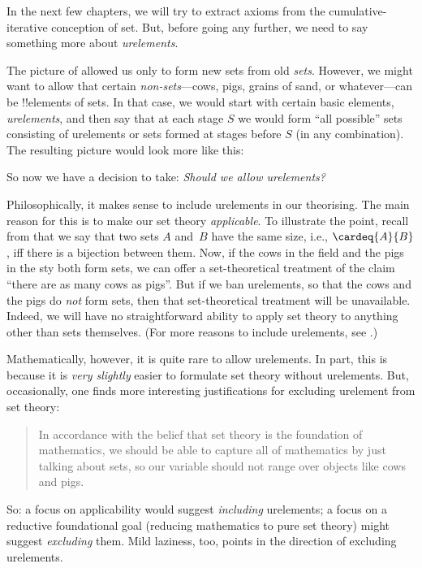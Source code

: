 \documentclass[../../../include/open-logic-section]{subfiles}
\begin{document}

In the next few chapters, we will try to extract axioms from the
cumulative-iterative conception of set. But, before going any further,
we need to say something more about \emph{urelements}. 

The picture of  allowed us only to form new sets
from old \emph{sets}. However, we might want to allow that certain
\emph{non-sets}---cows, pigs, grains of sand, or whatever---can be
!!{element}s of sets. In that case, we would start with certain basic
elements, \emph{urelements}, and then say that at each stage $S$ we
would form ``all possible'' sets consisting of urelements or sets
formed at stages before $S$ (in any combination). The resulting
picture would look more like this:
\begin{center}
\end{center}
So now we have a decision to take: \emph{Should we allow urelements?}

Philosophically, it makes sense to include urelements in our
theorising. The main reason for this is to make our set theory
\emph{applicable}. To illustrate the point, recall from
 that we say that two sets $A$ and~$B$ have
the same size, i.e., $\cardeq{A}{B}$, iff there is a bijection between
them. Now, if the cows in the field and the pigs in the sty both form
sets, we can offer a set-theoretical treatment of the claim ``there
are as many cows as pigs''. But if we ban urelements, so that the cows
and the pigs do \emph{not} form sets, then that set-theoretical
treatment will be unavailable. Indeed, we will have no straightforward
ability to apply set theory to anything other than sets themselves.
(For more reasons to include urelements, see \cite[pp.~vi, 24,
50--1]{Potter2004}.)

Mathematically, however, it is quite rare to allow urelements. In
part, this is because it is \emph{very slightly} easier to formulate
set theory without urelements. But, occasionally, one finds more
interesting justifications for excluding urelement from set theory:
\begin{quote}
	In accordance with the belief that set theory is the foundation of
	mathematics, we should be able to capture all of mathematics by
	just talking about sets, so our variable should not range over
	objects like cows and pigs. 
	\cite[p.~8]{Kunen1980}
\end{quote}
So: a focus on applicability would suggest \emph{including}
urelements; a focus on a reductive foundational goal (reducing
mathematics to pure set theory) might suggest \emph{excluding} them.
Mild laziness, too, points in the direction of excluding urelements. 
\end{document}
